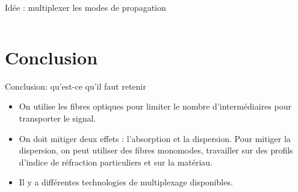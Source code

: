 \documentclass[aspectratio=149, 10pt, t]{beamer}
\begin{document}
\begin{frame}{Idée : multiplexer les modes de propagation}
\begin{columns}[b]
\begin{column}{0.5\linewidth}
        \end{column}
    \end{columns}
    
\end{frame}

\section{Conclusion}

\begin{frame}{Conclusion: qu'est-ce qu'il faut retenir}
    \begin{itemize}
        \item On utilise les fibres optiques pour limiter le nombre d'intermédiaires pour transporter le signal.
        \item On doit mitiger deux effets : l'absorption et la dispersion. Pour mitiger la dispersion, on peut utiliser des fibres monomodes, travailler sur des profils d'indice de réfraction particuliers et sur la matériau.
        \item Il y a différentes technologies de multiplexage disponibles.
    \end{itemize}
\end{frame}
\end{document}
